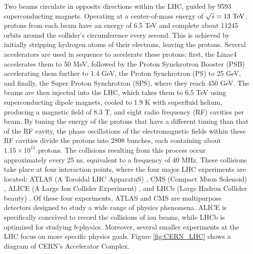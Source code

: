 Two beams circulate in opposite directions within the LHC, guided by 9593 superconducting magnets. Operating at a center-of-mass energy of $\sqrt{s} = 13\ \text{TeV}$, protons from each beam have an energy of 6.5 TeV and complete about 11245 orbits around the collider's circumference every second. This is achieved by initially stripping hydrogen atoms of their electrons, leaving the protons. Several accelerators are used in sequence to accelerate these protons: first, the Linac4 accelerates them to 50 MeV, followed by the Proton Synchrotron Booster (PSB) accelerating them further to 1.4 GeV, the Proton Synchrotron (PS) to 25 GeV, and finally, the Super Proton Synchrotron (SPS), where they reach 450 GeV. The beams are then injected into the LHC, which takes them to 6.5 TeV using superconducting dipole magnets, cooled to 1.9 K with superfluid helium, producing a magnetic field of 8.3 T, and eight radio frequency (RF) cavities per beam. By tuning the energy of the protons that have a different timing than that of the RF cavity, the phase oscillations of the electromagnetic fields within these RF cavities divide the protons into 2808 bunches, each containing about $1.15\times10^{11}$ protons. The collisions resulting from this process occur approximately every 25 ns, equivalent to a frequency of 40 MHz. These collisions take place at four interaction points, where the four major LHC experiments are located: ATLAS (A Toroidal LHC ApparatuS) \cite{ATLAS:1994vge}, CMS (Compact Muon Solenoid) \cite{CMS:1994hea}, ALICE (A Large Ion Collider Experiment) \cite{413235}, and LHCb (Large Hadron Collider beauty) \cite{LHCb:1998kcv}. Of these four experiments, ATLAS and CMS are multipurpose detectors designed to study a wide range of physics phenomena. ALICE is specifically conceived to record the collisions of ion beams, while LHCb is optimized for studying $b$-physics. Moreover, several smaller experiments at the LHC focus on more specific physics goals. Figure \ref{fig:CERN_LHC} shows a diagram of CERN's Accelerator Complex.

